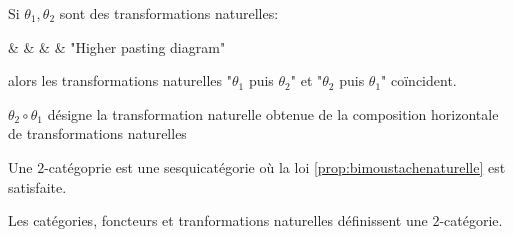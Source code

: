 \documentclass[math]{cours}
\begin{document}
\begin{proposition}
	Si $\theta_{1}, \theta_{2}$ sont des transformations naturelles:
	\begin{category}[]
		\A\ar[r, bend left=50, "G_{1}" name=B1]\ar[r, bend right=50, "F_{1}" {swap, name=A1}] & \B\ar[r, bend left=50, "G_{2}" name=B2]\ar[r, bend right=50, "F_{2}" {swap, name=A2}] & \cont & & "Higher pasting diagram"
	\end{category}
	alors les transformations naturelles "$\theta_{1}$ puis $\theta_{2}$" et "$\theta_{2}$ puis $\theta_{1}$" coïncident.
	\label{prop:bimoustachenaturelle}
\end{proposition}

\begin{vocabulary}
	$\theta_{2} \circ \theta_{1}$ désigne la transformation naturelle obtenue de la composition horizontale de
	transformations naturelles
\end{vocabulary}

\begin{definition}
	Une $2$-catégoprie est une sesquicatégorie où la loi \ref{prop:bimoustachenaturelle} est satisfaite.
	\label{def:2catégorie}
\end{definition}

\begin{thm}
	Les catégories, foncteurs et tranformations naturelles définissent une $2$-catégorie.
\end{thm}
\end{document}
